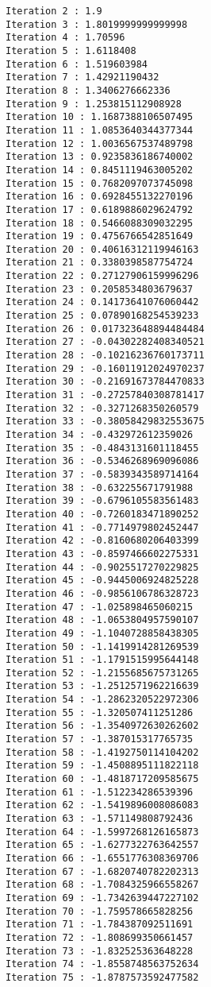\documentclass[11pt]{article}
\begin{document}
    \begin{Verbatim}[commandchars=\\\{\}]
Iteration 2 : 1.9
Iteration 3 : 1.8019999999999998
Iteration 4 : 1.70596
Iteration 5 : 1.6118408
Iteration 6 : 1.519603984
Iteration 7 : 1.42921190432
Iteration 8 : 1.3406276662336
Iteration 9 : 1.253815112908928
Iteration 10 : 1.1687388106507495
Iteration 11 : 1.0853640344377344
Iteration 12 : 1.0036567537489798
Iteration 13 : 0.9235836186740002
Iteration 14 : 0.8451119463005202
Iteration 15 : 0.7682097073745098
Iteration 16 : 0.6928455132270196
Iteration 17 : 0.6189886029624792
Iteration 18 : 0.5466088309032295
Iteration 19 : 0.4756766542851649
Iteration 20 : 0.40616312119946163
Iteration 21 : 0.3380398587754724
Iteration 22 : 0.27127906159996296
Iteration 23 : 0.2058534803679637
Iteration 24 : 0.14173641076060442
Iteration 25 : 0.07890168254539233
Iteration 26 : 0.017323648894484484
Iteration 27 : -0.04302282408340521
Iteration 28 : -0.10216236760173711
Iteration 29 : -0.16011912024970237
Iteration 30 : -0.21691673784470833
Iteration 31 : -0.27257840308781417
Iteration 32 : -0.3271268350260579
Iteration 33 : -0.38058429832553675
Iteration 34 : -0.432972612359026
Iteration 35 : -0.4843131601118455
Iteration 36 : -0.5346268969096086
Iteration 37 : -0.5839343589714164
Iteration 38 : -0.632255671791988
Iteration 39 : -0.6796105583561483
Iteration 40 : -0.7260183471890252
Iteration 41 : -0.7714979802452447
Iteration 42 : -0.8160680206403399
Iteration 43 : -0.8597466602275331
Iteration 44 : -0.9025517270229825
Iteration 45 : -0.9445006924825228
Iteration 46 : -0.9856106786328723
Iteration 47 : -1.025898465060215
Iteration 48 : -1.0653804957590107
Iteration 49 : -1.1040728858438305
Iteration 50 : -1.1419914281269539
Iteration 51 : -1.1791515995644148
Iteration 52 : -1.2155685675731265
Iteration 53 : -1.2512571962216639
Iteration 54 : -1.2862320522972306
Iteration 55 : -1.320507411251286
Iteration 56 : -1.3540972630262602
Iteration 57 : -1.387015317765735
Iteration 58 : -1.4192750114104202
Iteration 59 : -1.4508895111822118
Iteration 60 : -1.4818717209585675
Iteration 61 : -1.512234286539396
Iteration 62 : -1.5419896008086083
Iteration 63 : -1.571149808792436
Iteration 64 : -1.5997268126165873
Iteration 65 : -1.6277322763642557
Iteration 66 : -1.6551776308369706
Iteration 67 : -1.6820740782202313
Iteration 68 : -1.7084325966558267
Iteration 69 : -1.7342639447227102
Iteration 70 : -1.759578665828256
Iteration 71 : -1.784387092511691
Iteration 72 : -1.808699350661457
Iteration 73 : -1.832525363648228
Iteration 74 : -1.8558748563752634
Iteration 75 : -1.8787573592477582

\end{Verbatim}
\end{document}
